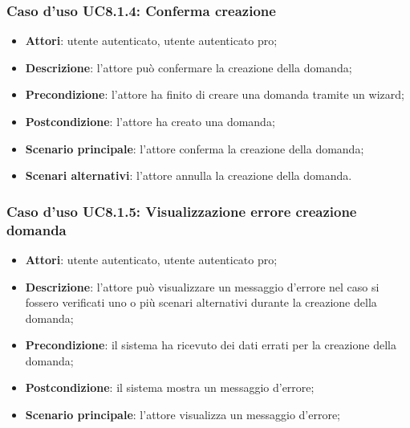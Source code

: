 








	\subsubsection{Caso d'uso UC8.1.4: Conferma creazione}
	\begin{itemize}
		\item
			\textbf{Attori}: utente autenticato, utente autenticato pro;
		\item
			\textbf{Descrizione}: l'attore può confermare la creazione della domanda;
		\item		
			\textbf{Precondizione}: l'attore ha finito di creare una domanda tramite un wizard;
		\item
			\textbf{Postcondizione}: l'attore ha creato una domanda;
		\item
			\textbf{Scenario principale}: l'attore conferma la creazione della domanda;		
		\item
	 		\textbf{Scenari alternativi}: l'attore annulla la creazione della domanda.
					
	\end{itemize}	
	
	\subsubsection{Caso d'uso UC8.1.5: Visualizzazione errore creazione domanda}
	\begin{itemize}
		\item
			\textbf{Attori}: utente autenticato, utente autenticato pro;
		\item
			\textbf{Descrizione}: l'attore può visualizzare un messaggio d'errore nel caso si fossero verificati uno o più scenari alternativi durante la creazione della domanda;
		\item		
			\textbf{Precondizione}: il sistema ha ricevuto dei dati errati per la creazione della domanda;
		\item
			\textbf{Postcondizione}: il sistema mostra un messaggio d'errore;
		\item
			\textbf{Scenario principale}: l'attore visualizza un messaggio d'errore;	
	\end{itemize}	


